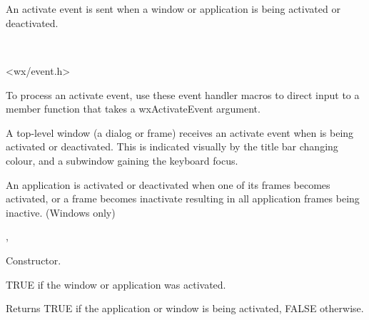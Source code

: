 \section{}\label{wxactivateevent}

An activate event is sent when a window or application is being activated
or deactivated.


\\


<wx/event.h>


To process an activate event, use these event handler macros to direct input to a member
function that takes a wxActivateEvent argument.

\twocolwidtha{7cm}
\begin{twocollist}\itemsep=0pt
\end{twocollist}%


A top-level window (a dialog or frame) receives an activate event when is
being activated or deactivated. This is indicated visually by the title
bar changing colour, and a subwindow gaining the keyboard focus.

An application is activated or deactivated when one of its frames becomes activated,
or a frame becomes inactivate resulting in all application frames being inactive. (Windows only)


,\rtfsp
{}




Constructor.



TRUE if the window or application was activated.

\label{wxactivateeventgetactive}


Returns TRUE if the application or window is being activated, FALSE otherwise.

